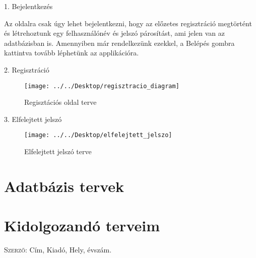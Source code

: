 \documentclass{thesis-ekf}
\begin{document}
	\begin{flushleft}
		1. Bejelentkezés
	\end{flushleft}

	Az oldalra csak úgy lehet bejelentkezni, hogy az előzetes regisztráció megtörtént és létrehoztunk egy felhasználónév és jelszó párosítást, ami jelen van az adatbázisban is. Amennyiben már rendelkezünk ezekkel, a Belépés gombra kattintva tovább léphetünk az applikációra.
	
	\begin{flushleft}
		2. Regisztráció
	\end{flushleft}

	\begin{figure}[th!]
		\centering
		\texttt{[image: ../../Desktop/regisztracio\_diagram]}
		\caption{Regisztációs oldal terve}
		\label{abra-regisztraciodiagram}
	\end{figure}
	
	\newpage
	\begin{flushleft}
		3. Elfelejtett jelszó
	\end{flushleft}
	\begin{figure}[th!]
		\centering
		\texttt{[image: ../../Desktop/elfelejtett\_jelszo]}
		\caption{Elfelejtett jelszó terve}
		\label{abra-elfelejtettjelszo}
	\end{figure}
	
	
	\section{Adatbázis tervek}
	\section{Kidolgozandó terveim}
	\begin{thebibliography}{1}
		 \textsc{Szerző}: Cím, Kiadó, Hely, évszám.
	\end{thebibliography}
\end{document}
